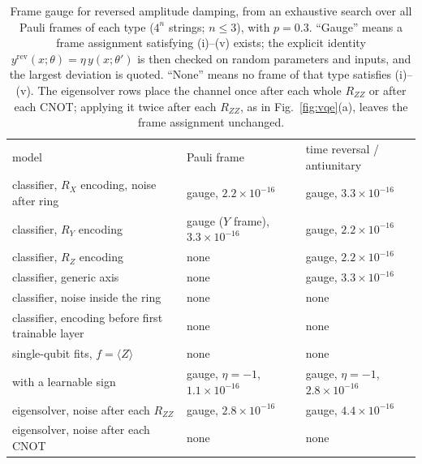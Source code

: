 \documentclass[
 aps,pra,
 twocolumn,
 superscriptaddress,
 longbibliography,
 nofootinbib
]{revtex4-2}
\begin{document}
\begin{table}[t]
\caption{Frame gauge for reversed amplitude damping, from an exhaustive search over all
Pauli frames of each type ($4^n$ strings; $n\le3$), with $p=0.3$. ``Gauge'' means a frame
assignment satisfying (i)--(v) exists; the explicit identity
$y^{\mathrm{rev}}(x;\theta)=\eta\,y(x;\theta')$ is then checked on random parameters and inputs, and
the largest deviation is quoted. ``None'' means no frame of that type satisfies (i)--(v). The eigensolver rows place the channel once after each whole $R_{ZZ}$ or after each CNOT; applying it twice after each $R_{ZZ}$, as in Fig.~\ref{fig:vqe}(a), leaves the frame assignment unchanged.}
\label{tab:gauge}
\begin{ruledtabular}
\begin{tabular}{lll}
model & Pauli frame & time reversal / antiunitary\\
\colrule
classifier, $R_X$ encoding, noise after ring  & gauge, $2.2\times10^{-16}$ & gauge, $3.3\times10^{-16}$\\
classifier, $R_Y$ encoding                     & gauge ($Y$ frame), $3.3\times10^{-16}$ & gauge, $2.2\times10^{-16}$\\
classifier, $R_Z$ encoding                     & none       & gauge, $2.2\times10^{-16}$\\
classifier, generic axis                       & none       & gauge, $3.3\times10^{-16}$\\
classifier, noise inside the ring              & none       & none\\
classifier, encoding before first trainable layer & none    & none\\
single-qubit fits, $f=\langle Z\rangle$  & none       & none\\
\quad with a learnable sign                    & gauge, $\eta=-1$, $1.1\times10^{-16}$ & gauge, $\eta=-1$, $2.8\times10^{-16}$\\
eigensolver, noise after each $R_{ZZ}$         & gauge, $2.8\times10^{-16}$ & gauge, $4.4\times10^{-16}$\\
eigensolver, noise after each CNOT            & none       & none\\
\end{tabular}
\end{ruledtabular}
\end{table}
\end{document}
